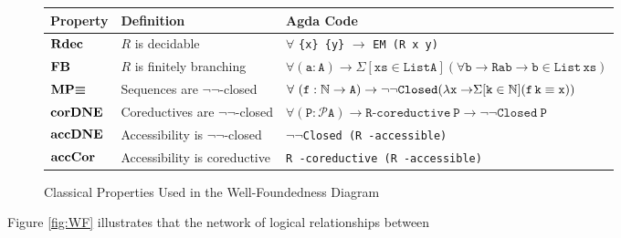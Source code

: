 
{
\def\arraystretch{1.3}
\begin{figure}[h!]
\small
\begin{tabular}{@{}l l l @{}}
\toprule
\textbf{Property} & \textbf{Definition}  &\textbf{Agda Code}  \\
\midrule
$\mathbf{Rdec}$   & $R$ is decidable
          & $\forall$ \verb|{x} {y}| $\to$ \verb|EM (R x y)|\\
$\mathbf{FB}$     & $R$ is finitely branching
          & $\mathtt{\forall (a : A) \to}\Sigma\mathtt{[ xs \in List A ] (\forall b \to R a b \to b \in{}List\, xs)}$ \\
$\mathbf{MP}{\boldsymbol{\equiv}}$    & Sequences are $\lnot\lnot$-closed
          & $\forall\ \mathtt{(f : \nat \to A) \to \lnot\lnot Closed
        (\lambda x \to} \Sigma \mathtt{[ k \in \nat ] (f\, k \equiv x))}$ \\
$\mathbf{corDNE}$ & Coreductives are $\lnot\lnot$-closed
          & $\mathtt{\forall (P : \mathcal{P} A) \to R}$-$\mathtt{coreductive\ P \to \lnot\lnot Closed\ P}$\\
$\mathbf{accDNE}$ & Accessibility is $\lnot\lnot$-closed
          & $\lnot\lnot$\verb|Closed (R -accessible)| \\
$\mathbf{accCor}$ & Accessibility is coreductive
          & \verb|R -coreductive (R -accessible)| \\

\bottomrule
\end{tabular}
\centering
\caption{Classical Properties Used in the Well-Foundedness Diagram}
\label{tab:cprop}
\end{figure}
}
Figure \ref{fig:WF} illustrates that the network of logical relationships between
